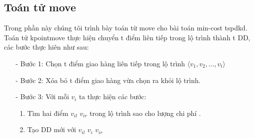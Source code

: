 \documentclass[a4paper,12pt]{report}
\begin{document}
\subsection{Toán tử move}
Trong phần này chúng tôi trình bày toán từ move cho bài toán min-cost tspdkd.\\

Toán tử kpointmove thực hiện chuyển t điểm liên tiếp trong lộ trình thành t DD, các bước thực hiên như sau: 
\begin{itemize}
\item[-] Bước 1: Chọn t điểm giao hàng liên tiếp trong lộ trình $\langle v_1,v_2,\ldots,v_t \rangle$
\item[-] Bước 2: Xóa bỏ t điểm giao hàng vừa chọn ra khỏi lộ trình.
\item[-] Bước 3: Với mỗi $v_i$ ta thực hiện các bước: 
\begin{enumerate}
\item Tìm hai điểm $v_{il}$ $v_{ir}$ trong lộ trình sao cho lượng chi phí .
\item Tạo DD mới với $v_{il}$ $v_{i}$ $v_{ir}$
\end{enumerate}
\end{itemize}
\end{document}
